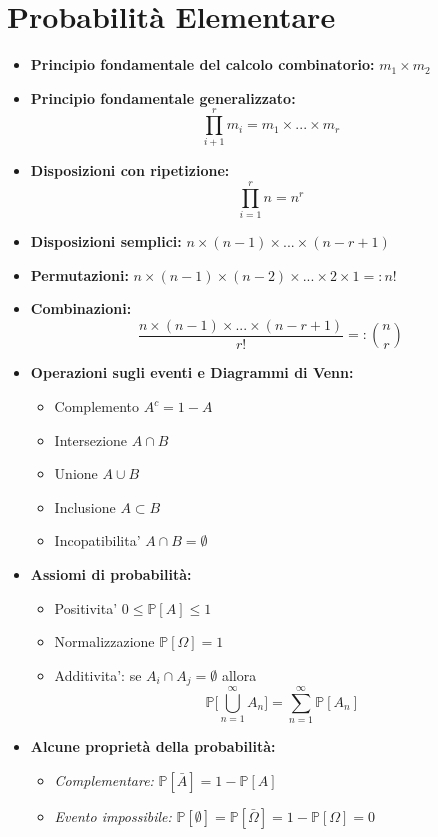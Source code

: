 \chapter{Probabilità Elementare}
\begin{itemize}
    \item \textbf{Principio fondamentale del calcolo combinatorio:} \(m_1 \times m_2\)
    \item \textbf{Principio fondamentale generalizzato:} \[\prod_{i+1}^rm_i = m_1 \times ... \times m_r\]
    \item \textbf{Disposizioni con ripetizione:} \[\prod_{i=1}^rn = n^r\]
    \item \textbf{Disposizioni semplici:} \(n \times (n - 1) \times ... \times (n - r + 1)\)
    \item \textbf{Permutazioni:} \(n \times (n - 1) \times (n - 2) \times ... \times 2 \times 1 =: n!\)
    \item \textbf{Combinazioni:} \[\frac{n \times (n - 1) \times ... \times (n - r + 1)}{r!} =: {n \choose r}\]
    \item \textbf{Operazioni sugli eventi e Diagrammi di Venn:}
    \begin{itemize}
        \item Complemento \(A^c = 1 - A\)
        \item Intersezione \(A \cap B\)
        \item Unione \(A \cup B\)
        \item Inclusione \(A \subset B\)
        \item Incopatibilita' \(A \cap B = \emptyset\)
    \end{itemize}
    \item \textbf{Assiomi di probabilità:}
    \begin{itemize}
        \item Positivita' \(0 \leq \mathbb{P}[A] \leq 1\)
        \item Normalizzazione \(\mathbb{P}[\Omega] = 1\)
        \item Additivita': se \(A_i \cap A_j = \emptyset\) allora
        \[\mathbb{P}\Bigg[\bigcup_{n=1}^\infty A_n\Bigg] = \sum_{n=1}^\infty \mathbb{P}[A_n]\]
    \end{itemize}
    \item \textbf{Alcune proprietà della probabilità:}
    \begin{itemize}
        \item \textit{Complementare:} \(\mathbb{P}[\bar{A}] = 1-\mathbb{P}[A]\)
        \item \textit{Evento impossibile:} \(\mathbb{P}[\emptyset] = \mathbb{P}[\bar{\Omega}] = 1-\mathbb{P}[\Omega] = 0\)

\end{itemize}
\end{itemize}
